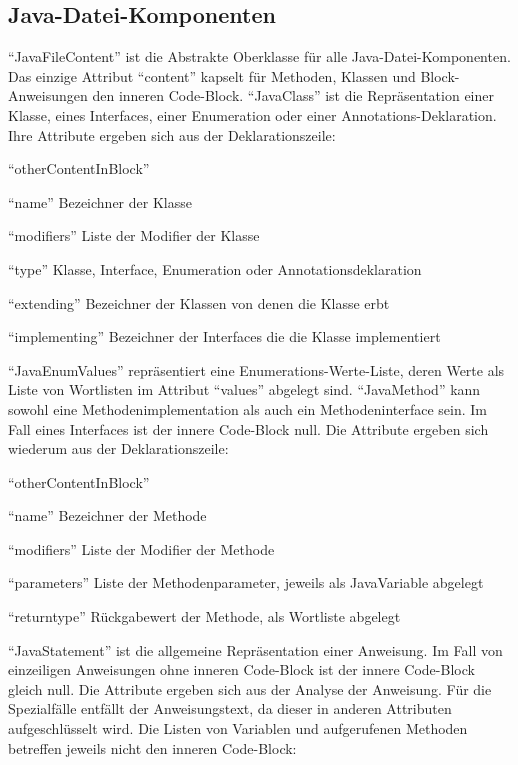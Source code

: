 \documentclass[gb,ngerman]{stthesis}
\begin{document}
			\subsection{Java-Datei-Komponenten}
				"`JavaFileContent"' ist die Abstrakte Oberklasse für alle Java-Datei-Komponenten. Das einzige Attribut "`content"' kapselt für Methoden, Klassen und Block-Anweisungen den inneren Code-Block. \newline \newline
				"`JavaClass"' ist die Repräsentation einer Klasse, eines Interfaces, einer Enumeration oder einer Annotations-Deklaration. Ihre Attribute ergeben sich aus der Deklarationszeile:  
				\begin{labeling} {"`otherContentInBlock"'}
					\item ["`name"'] Bezeichner der Klasse
					\item ["`modifiers"'] Liste der Modifier der Klasse
					\item ["`type"'] Klasse, Interface, Enumeration oder Annotationsdeklaration
					\item ["`extending"'] Bezeichner der Klassen von denen die Klasse erbt
					\item ["`implementing"'] Bezeichner der Interfaces die die Klasse implementiert
				\end{labeling} 
				"`JavaEnumValues"' repräsentiert eine Enumerations-Werte-Liste, deren Werte als Liste von Wortlisten im Attribut "`values"' abgelegt sind. \newline \newline
				"`JavaMethod"' kann sowohl eine Methodenimplementation als auch ein Methodeninterface sein. Im Fall eines Interfaces ist der innere Code-Block null. Die Attribute ergeben sich wiederum aus der Deklarationszeile:
				\begin{labeling} {"`otherContentInBlock"'}
					\item ["`name"'] Bezeichner der Methode
					\item ["`modifiers"'] Liste der Modifier der Methode
					\item ["`parameters"'] Liste der Methodenparameter, jeweils als JavaVariable abgelegt
					\item ["`returntype"'] Rückgabewert der Methode, als Wortliste abgelegt
				\end{labeling} 
				"`JavaStatement"' ist die allgemeine Repräsentation einer Anweisung. Im Fall von einzeiligen Anweisungen ohne inneren Code-Block ist der innere Code-Block gleich null. Die Attribute ergeben sich aus der Analyse der Anweisung. Für die Spezialfälle entfällt der Anweisungstext, da dieser in anderen Attributen aufgeschlüsselt wird. Die Listen von Variablen und aufgerufenen Methoden betreffen jeweils nicht den inneren Code-Block:
\end{document}
